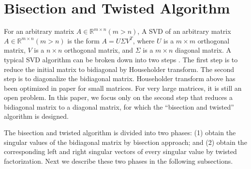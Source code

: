 \vspace{-0.1in}
\section{Bisection and Twisted Algorithm} \label{sec:algorithm}
\vspace{-0.1in}
For an arbitrary matrix $A\in \mathbb{R}^{m \times n} (m>n)$, 
A SVD of an arbitrary matrix $A\in \mathbb{R}^{m \times n} (m>n)$ is the form $A = U \Sigma V^T$, where $U$ is a $m \times m$ orthogonal matrix, $V$ is a $n\times n$ orthogonal matrix, and $\Sigma$ is a $m\times n$ diagonal matrix.
A typical SVD algorithm can be broken down into two steps \cite{65SIAM}.
The first step is to reduce the initial matrix to bidiagonal by Householder transform.
The second step is to diagonalize the bidiagonal matrix.
{\color{red}Householder transform above has been optimized in paper \cite{LiuHouseholder} for small matrices. For very large matrices, it is still an open problem.} 
In this paper, we focus only on the second step that reduces a bidiagonal matrix to a diagonal matrix, for which the  ``bisection and twisted'' algorithm is designed.

 
The bisection and twisted algorithm is divided into two phases:
(1) obtain the singular values of the bidiagonal matrix by bisection approach; and
(2) obtain the corresponding left and right singular vectors of every singular value by twisted factorization.
Next we describe these two phases in the following subsections.

\vspace{-0.1in}
